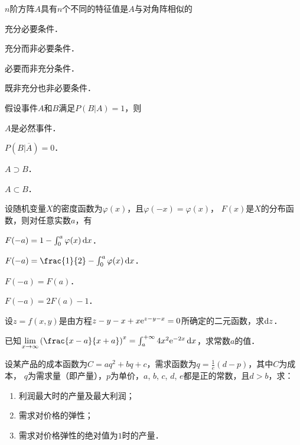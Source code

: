 \documentclass[plain,noanswer,medmath]{../../template/jnuexam}
\begin{document}
\begin{problem}
$n$阶方阵$A$具有$n$个不同的特征值是$A$与对角阵相似的\pickout{}
\begin{abcd}
\item 充分必要条件．					
\item 充分而非必要条件．
\item 必要而非充分条件．				
\item 既非充分也非必要条件．
\end{abcd}
\end{problem}


\begin{problem}
假设事件$A$和$B$满足$P(B|A) = 1$，则\pickout{}
\begin{abcd}
\item $A$是必然事件．					
\item $P(B|\overline{A}) = 0$．
\item $A \supset B$．							
\item $A \subset B$．
\end{abcd}
\end{problem}


\begin{problem}
设随机变量$X$的密度函数为$\varphi (x)$，且$\varphi(-x)=\varphi(x)$，
$F(x)$是$X$的分布函数，则对任意实数$a$，有\pickout{}
\begin{abcd}
\item $F(- a) = 1 - \int_0^a \varphi(x)\mathop{}\!\mathrm{d} x$．
\item $F(- a) = \frac{1}{2} - \int_0^a \varphi(x)\dx$．
\item $F(- a) = F(a)$．
\item $F(- a) = 2F(a) - 1$．
\end{abcd}
\end{problem}



\begin{problem}
设$z = f\left(x,y \right)$是由方程$z - y - x + x\mathrm{e}^{z - y - x} = 0$所确定的二元函数，求$\mathop{}\!\mathrm{d} z$．
\end{problem}



\begin{problem}
已知$\lim_{x \to \infty} \left(\frac{x - a}{x + a} \right)^x
= \int_a^{+\infty} 4x^2\e^{- 2x} \dx$，求常数$a$的值．
\end{problem}



\begin{problem}
设某产品的成本函数为$C = aq^2 + bq + c$，需求函数为$q = \frac{1}{e}(d - p)$，其中$C$为成本，
$q$为需求量（即产量），$p$为单价，$a$, $b$, $c$, $d$, $e$都是正的常数，且$d > b$，求：
\begin{enumerate}
\item 利润最大时的产量及最大利润；
\item 需求对价格的弹性；
\item 需求对价格弹性的绝对值为$1$时的产量．
\end{enumerate}
\end{problem}
\end{document}
